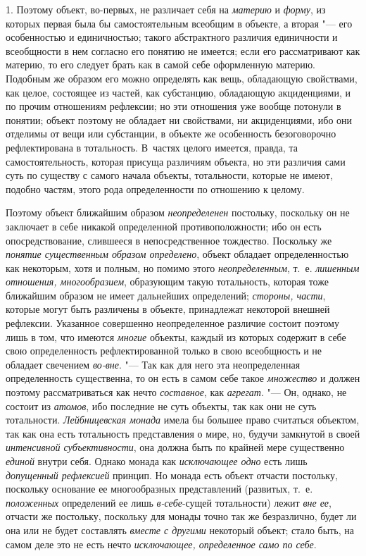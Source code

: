 1. Поэтому объект, во-первых, не различает себя на {\em материю} и
{\em форму}, из которых первая была бы самостоятельным всеобщим в объекте,
а вторая "--- его особенностью и единичностью; такого абстрактного
различия единичности и всеобщности в нем согласно его понятию не имеется;
если его рассматривают как материю, то его следует брать как в самой себе
оформленную материю. Подобным же образом его можно определять как вещь,
обладающую свойствами, как целое, состоящее из частей, как субстанцию,
обладающую акциденциями, и по прочим отношениям рефлексии; но эти отношения
уже вообще потонули в понятии; объект поэтому не обладает ни свойствами, ни
акциденциями, ибо они отделимы от вещи или субстанции, в объекте же
особенность безоговорочно рефлектирована в тотальность. В~частях целого
имеется, правда, та самостоятельность, которая присуща различиям объекта,
но эти различия сами суть по существу с самого начала объекты, тотальности,
которые не имеют, подобно частям, этого рода определенности по отношению к
целому.

Поэтому объект ближайшим образом {\em неопределенен}
постольку, поскольку он не заключает в себе никакой
определенной противоположности; ибо он есть опосредствование, слившееся в
непосредственное тождество. Поскольку же {\em понятие существенным образом
определено}, объект обладает определенностью как некоторым,
хотя и полным, но помимо этого {\em неопределенным},
т.~е. {\em лишенным отношения, многообразием}, образующим такую тотальность,
которая тоже ближайшим образом не имеет дальнейших определений;
{\em стороны, части},
которые могут быть различены в объекте, принадлежат некоторой
внешней рефлексии. Указанное совершенно неопределенное различие состоит
поэтому лишь в том, что имеются {\em многие} объекты,
каждый из которых содержит в себе свою определенность рефлектированной
только в свою всеобщность и не обладает свечением {\em во-вне}. "--- Так как
для него эта неопределенная определенность существенна, то он есть в самом
себе такое {\em множество} и должен поэтому рассматриваться как нечто
{\em составное}, как {\em агрегат}. "--- Он,
однако, не состоит из {\em атомов},
ибо последние не суть объекты, так как они не суть
тотальности. {\em Лейбницевская монада}
имела бы большее право считаться объектом, так как она есть
тотальность представления о мире, но, будучи замкнутой в своей
{\em интенсивной субъективности}, она должна быть по крайней мере существенно
{\em единой} внутри себя. Однако монада как {\em исключающее
одно} есть лишь {\em допущенный рефлексией}
принцип. Но монада есть объект отчасти постольку, поскольку
основание ее многообразных представлений (развитых, т.~е.
{\em положенных} определений ее лишь {\em в-себе}{}-сущей
тотальности) лежит {\em вне ее},
отчасти же постольку, поскольку для монады точно так же
безразлично, будет ли она или не будет составлять {\em вместе с другими}
некоторый объект; стало быть, на самом деле это не есть нечто
{\em исключающее, определенное само по себе}.

